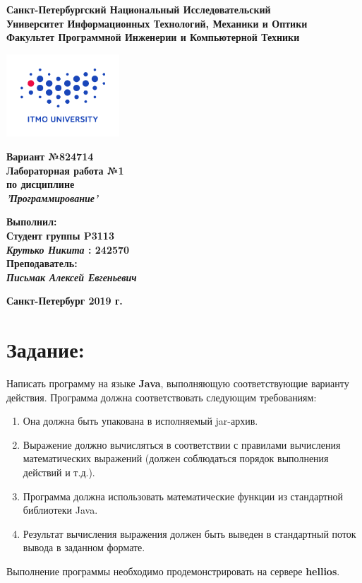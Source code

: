 \documentclass[11pt]{article}
\author{Крутько Никита}
\date{\today}
\title{}
\begin{document}
\begin{center}
\textbf{Санкт-Петербургский Национальный Исследовательский}\\
\textbf{Университет Информационных Технологий, Механики и Оптики}\\
\textbf{Факультет Программной Инженерии и Компьютерной Техники}\\
\end{center}
\vspace{1em}
\begin{center}
\includegraphics[width=120pt]{./itmo-logo.png}
\end{center}
\LARGE
\vspace{5em}
\begin{center}
\textbf{Вариант №824714}\\
\textbf{Лабораторная работа №1}\\
\Large
\textbf{по дисциплине}\\
\LARGE
\textbf{\emph{'Программирование'}}\\
\end{center}
\vspace{11em}
\large
\begin{flushright}
\textbf{Выполнил:}\\
\textbf{Студент группы P3113}\\
\textbf{\emph{Крутько Никита} : 242570}\\
\textbf{Преподаватель:}\\
\textbf{\emph{Письмак Алексей Евгеньевич}}\\
\end{flushright}
\vspace{4em}
\large
\begin{center}
\textbf{Санкт-Петербург 2019 г.}
\end{center}
\pagebreak{}
\section{Задание:}
\label{sec:org089fcbd}
Написать программу на языке \textbf{Java}, выполняющую соответствующие варианту действия. Программа должна соответствовать следующим требованиям:
\begin{enumerate}
\item Она должна быть упакована в исполняемый jar-архив.
\item Выражение должно вычисляться в соответствии с правилами вычисления математи\-чес\-ких выражений (должен соблюдаться порядок выполнения действий и т.д.).
\item Программа должна использовать математические функции из стандартной биб\-лиотеки Java.
\item Результат вычисления выражения должен быть выведен в стандартный поток вывода в заданном формате.
\end{enumerate}
Выполнение программы необходимо продемонстрировать на сервере \textbf{hellios}.
\end{document}
